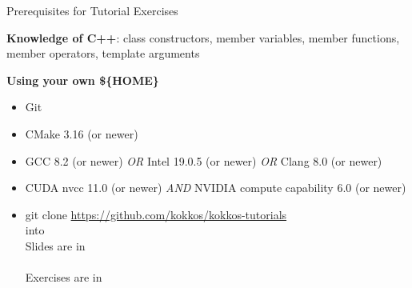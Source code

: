 




\begin{frame}{Prerequisites for Tutorial Exercises}

\textbf{Knowledge of C++}:
  class constructors, member variables, member functions, member operators, template arguments

\vspace{10pt}


\vspace{10pt}

\textbf{Using your own {\$\{HOME\}}}
\begin{scriptsize}
  \begin{itemize}
  \item {Git}
  \item {CMake 3.16 (or newer)}
  \item {GCC 8.2 (or newer)}
    \textit{OR} {Intel 19.0.5 (or newer)}
    \textit{OR} {Clang 8.0 (or newer)}
  \item {CUDA nvcc 11.0 (or newer)}
    \textit{AND} {NVIDIA compute capability 6.0 (or newer)}
  \item {git clone \url{https://github.com/kokkos/kokkos-tutorials} \\ \hspace{2pt}  into }
        \\ \vspace{4pt} \hspace{2pt} Slides are in \\ \hspace{8pt} 
        \\ \vspace{4pt} \hspace{2pt} Exercises are in \\ \hspace{8pt} 
  \end{itemize}
\end{scriptsize}

\end{frame}


